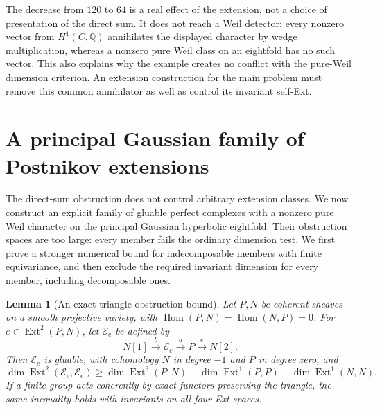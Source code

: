 \documentclass[11pt]{article}
\newtheorem{lemma}[theorem]{Lemma}
\theoremstyle{definition}
\theoremstyle{remark}
\begin{document}
The decrease from $120$ to $64$ is a real effect of the extension,
not a choice of presentation of the direct sum.  It does not
reach a Weil detector: every nonzero vector from
$H^1(C,\mathbb Q)$ annihilates the displayed character by wedge
multiplication, whereas a nonzero pure Weil class on an eightfold
has no such vector.  This also explains why the example creates
no conflict with the pure-Weil dimension criterion.  An extension
construction for the main problem must remove this common
annihilator as well as control its invariant self-Ext.
\section{A principal Gaussian family of Postnikov extensions}
\label{sec:principal-graph-postnikov}

The direct-sum obstruction does not control arbitrary extension
classes.  We now construct an explicit family of gluable perfect
complexes with a nonzero pure Weil character on the principal
Gaussian hyperbolic eightfold.  Their obstruction spaces are too
large: every member fails the ordinary dimension test.  We first
prove a stronger numerical bound for indecomposable members with
finite equivariance, and then exclude the required invariant
dimension for every member, including decomposable ones.

\begin{lemma}[An exact-triangle obstruction bound]
\label{lem:postnikov-ext-bound}
Let $P,N$ be coherent sheaves on a smooth projective variety, with
$\operatorname{Hom}(P,N)=\operatorname{Hom}(N,P)=0$.
For $e\in\operatorname{Ext}^2(P,N)$, let $\mathcal E_e$ be defined by
\begin{equation}
 \label{eq:postnikov-triangle}
 N[1]\xrightarrow{b}\mathcal E_e\xrightarrow{a}P
                  \xrightarrow{e}N[2].
\end{equation}
Then $\mathcal E_e$ is gluable, with cohomology $N$ in degree $-1$
and $P$ in degree zero, and
\begin{equation}
 \label{eq:postnikov-ext-lower}
 \dim\operatorname{Ext}^2(\mathcal E_e,\mathcal E_e)
 \geq\dim\operatorname{Ext}^3(P,N)
      -\dim\operatorname{Ext}^1(P,P)
      -\dim\operatorname{Ext}^1(N,N).
\end{equation}
If a finite group acts coherently by exact functors preserving the
triangle, the same inequality holds with invariants on all four
Ext spaces.
\end{lemma}
\end{document}
